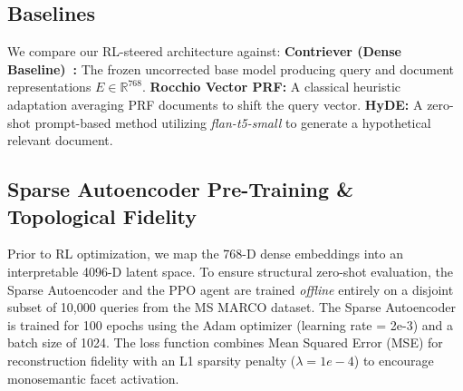 \begin{table}[htbp]
    \caption{Benchmark Dataset Statistics}
    \begin{center}
    \end{center}
    \label{tab:datasets}
\end{table}

\subsection{Baselines}
We compare our RL-steered architecture against:
\textbf{Contriever (Dense Baseline)~\citep{izacard2022}:} The frozen uncorrected base model producing query and document representations $E \in \mathbb{R}^{768}$.
\textbf{Rocchio Vector PRF:} A classical heuristic adaptation averaging PRF documents to shift the query vector.
\textbf{HyDE:} A zero-shot prompt-based method utilizing \textit{flan-t5-small} to generate a hypothetical relevant document.

\subsection{Sparse Autoencoder Pre-Training \& Topological Fidelity}
Prior to RL optimization, we map the 768-D dense embeddings into an interpretable 4096-D latent space. To ensure structural zero-shot evaluation, the Sparse Autoencoder and the PPO agent are trained \textit{offline} entirely on a disjoint subset of 10,000 queries from the MS MARCO dataset. The Sparse Autoencoder is trained for 100 epochs using the Adam optimizer (learning rate = 2e-3) and a batch size of 1024. The loss function combines Mean Squared Error (MSE) for reconstruction fidelity with an L1 sparsity penalty ($\lambda = 1e-4$) to encourage monosemantic facet activation.

